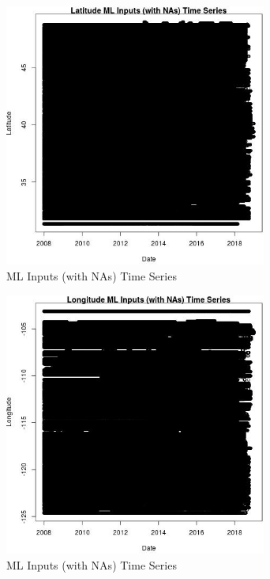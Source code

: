 \begin{figure} 
\centering  
\includegraphics[width=0.77\textwidth]{Code_Outputs/Report_ML_input_PM25_Step4_part_e_de_duplicated_aveswNAs_LatitudevDate.jpg} 
\caption{\label{fig:Report_ML_input_PM25_Step4_part_e_de_duplicated_aveswNAsLatitudevDate}ML Inputs (with NAs) Time Series} 
\end{figure} 
 

\begin{figure} 
\centering  
\includegraphics[width=0.77\textwidth]{Code_Outputs/Report_ML_input_PM25_Step4_part_e_de_duplicated_aveswNAs_LongitudevDate.jpg} 
\caption{\label{fig:Report_ML_input_PM25_Step4_part_e_de_duplicated_aveswNAsLongitudevDate}ML Inputs (with NAs) Time Series} 
\end{figure} 
 

